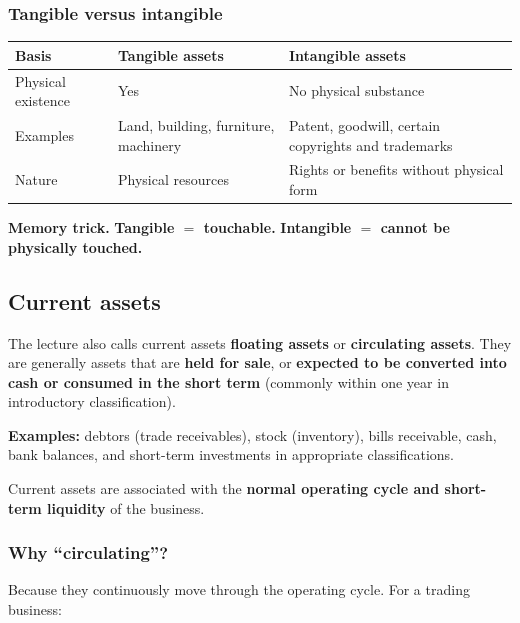\documentclass[11pt,a4paper]{article}
\begin{document}
\subsubsection{Tangible versus intangible}

\begin{center}
\small
\begin{tabularx}{\textwidth}{@{}l Y Y@{}}
\toprule
{}\textbf{Basis} & \textbf{Tangible assets} & \textbf{Intangible assets}\\
\midrule
Physical existence & Yes & No physical substance\\
Examples & Land, building, furniture, machinery & Patent, goodwill, certain copyrights and trademarks\\
Nature & Physical resources & Rights or benefits without physical form\\
\bottomrule
\end{tabularx}
\end{center}

\textbf{Memory trick.} \textbf{Tangible $=$ touchable.} \textbf{Intangible $=$ cannot be physically touched.}

\subsection{Current assets}

The lecture also calls current assets \textbf{floating assets} or \textbf{circulating assets}. They are
generally assets that are \textbf{held for sale}, or \textbf{expected to be converted into cash or consumed
in the short term} (commonly within one year in introductory classification).

\textbf{Examples:} debtors (trade receivables), stock (inventory), bills receivable, cash, bank balances, and
short-term investments in appropriate classifications.

Current assets are associated with the \textbf{normal operating cycle and short-term liquidity} of the business.

\subsubsection{Why ``circulating''?}

Because they continuously move through the operating cycle. For a trading business:

\begin{center}
\end{center}
\end{document}
